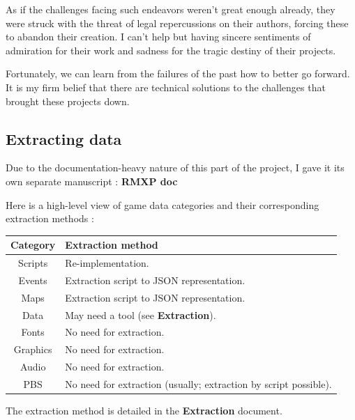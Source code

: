 \documentclass[11pt]{article}
\begin{document}
As if the challenges facing such endeavors weren't great enough already, they were struck with the threat of legal repercussions on their authors, forcing these to abandon their creation. I can't help but having sincere sentiments of admiration for their work and sadness for the tragic destiny of their projects.



Fortunately, we can learn from the failures of the past how to better go forward. It is my firm belief that there are technical solutions to the challenges that brought these projects down.


\subsection{Extracting data}

Due to the documentation-heavy nature of this part of the project, I gave it its own separate manuscript : \textbf{RMXP doc}

Here is a high-level view of game data categories and their corresponding extraction methods :

\begin{tabular}{|c |L{.6\linewidth}|}
	\hline
	\textbf{Category} & \textbf{Extraction method} \\
	\hline
	Scripts & Re-implementation. \\
	\hline
	Events & Extraction script to JSON representation. \\
	\hline
	Maps & Extraction script to JSON representation. \\
	\hline
	Data & May need a tool (see \textbf{Extraction}).  \\
	\hline
	Fonts & No need for extraction. \\
	\hline
	Graphics & No need for extraction. \\
	\hline
	Audio & No need for extraction. \\
	\hline
	PBS & No need for extraction (usually; extraction by script possible). \\
	\hline
\end{tabular}

The extraction method is detailed in the \textbf{Extraction} document.





\newpage

\nocite{*}
\printbibliography[heading=bibintoc]
\end{document}
